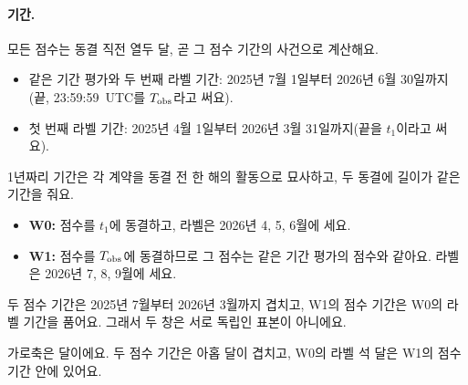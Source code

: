 \paragraph{기간.}
모든 점수는 동결 직전 열두 달, 곧 그 점수 기간의 사건으로 계산해요.
\begin{itemize}
\item 같은 기간 평가와 두 번째 라벨 기간: 2025년 7월 1일부터 2026년 6월 30일까지(끝, 23:59:59~UTC를 $T_{\mathrm{obs}}$라고 써요).
\item 첫 번째 라벨 기간: 2025년 4월 1일부터 2026년 3월 31일까지(끝을 $t_1$이라고 써요).
\end{itemize}
1년짜리 기간은 각 계약을 동결 전 한 해의 활동으로 묘사하고, 두 동결에 길이가 같은 기간을 줘요.
\begin{itemize}
\item \textbf{W0:} 점수를 $t_1$에 동결하고, 라벨은 2026년 4, 5, 6월에 세요.
\item \textbf{W1:} 점수를 $T_{\mathrm{obs}}$에 동결하므로 그 점수는 같은 기간 평가의 점수와 같아요. 라벨은 2026년 7, 8, 9월에 세요.
\end{itemize}
두 점수 기간은 2025년 7월부터 2026년 3월까지 겹치고, W1의 점수 기간은 W0의 라벨 기간을 품어요. 그래서 두 창은 서로 독립인 표본이 아니에요.

\begin{puri}
\begin{center}
\end{center}
가로축은 달이에요. 두 점수 기간은 아홉 달이 겹치고, W0의 라벨 석 달은 W1의 점수 기간 안에 있어요.
\end{puri}

